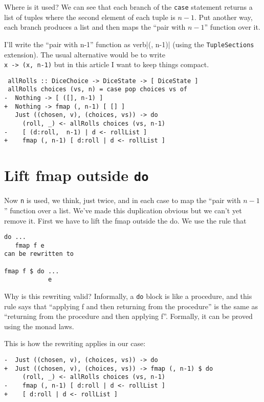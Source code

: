 Where is it used? We can see that each branch of the \texttt{case} statement returns a list of tuples where the second element of each tuple is $n-1$. Put another way, each branch produces a list and then maps the ``pair with $n-1$'' function over it.

I'll write the ``pair with n-1'' function as verb|(, n-1)| (using the \texttt{TupleSections} extension). The usual alternative would be to write \texttt{\\x -> (x, n-1)} but in this article I want to keep things compact.

\begin{verbatim}
 allRolls :: DiceChoice -> DiceState -> [ DiceState ]
 allRolls choices (vs, n) = case pop choices vs of
-  Nothing -> [ ([], n-1) ]
+  Nothing -> fmap (, n-1) [ [] ]
   Just ((chosen, v), (choices, vs)) -> do
     (roll, _) <- allRolls choices (vs, n-1)
-    [ (d:roll,  n-1) | d <- rollList ]
+    fmap (, n-1) [ d:roll | d <- rollList ]
\end{verbatim}


\section{Lift fmap outside \texttt{do}}


Now \texttt{n} is used, we think, just twice, and in each case to map the ``pair with $n-1$'' function over a list. We've made this duplication obvious but we can't yet remove it. First we have to lift the fmap outside the do. We use the rule that

\begin{verbatim}
do ...
   fmap f e
can be rewritten to

fmap f $ do ...
            e
\end{verbatim}
Why is this rewriting valid? Informally, a \texttt{do} block is like a procedure, and this rule says that ``applying f and then returning from the procedure'' is the same as ``returning from the procedure and then applying f''. Formally, it can be proved using the monad laws.

This is how the rewriting applies in our case:

\begin{verbatim}
-  Just ((chosen, v), (choices, vs)) -> do
+  Just ((chosen, v), (choices, vs)) -> fmap (, n-1) $ do
     (roll, _) <- allRolls choices (vs, n-1)
-    fmap (, n-1) [ d:roll | d <- rollList ]
+    [ d:roll | d <- rollList ]
\end{verbatim}

